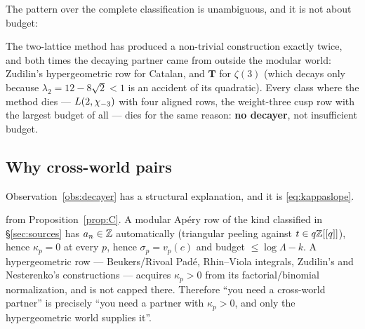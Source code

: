 \noindent
The pattern over the complete classification is unambiguous, and it is not
about budget:

\begin{observation}\label{obs:decayer}
The two-lattice method has produced a non-trivial construction exactly twice,
and both times the decaying partner came from outside the modular world:
Zudilin's hypergeometric row for Catalan, and $\mathbf T$ for $\zeta(3)$
(which decays only because $\lambda_2=12-8\sqrt2<1$ is an accident of its
quadratic).  Every class where the method dies --- $L(2,\chi_{-3})$ with four
aligned rows, the weight-three cusp row with the largest budget of all --- dies
for the same reason: \textbf{no decayer}, not insufficient budget.
\end{observation}

\subsection{Why cross-world pairs}\label{sec:5.5}

Observation~\ref{obs:decayer} has a structural explanation, and it is
\eqref{eq:kappaslope}.

\begin{proposition}\label{prop:crossworld}
\Proved{} from Proposition~\ref{prop:C}.  A modular Ap\'ery row of the kind
classified in \S\ref{sec:sources} has $a_n\in\mathbb{Z}$ automatically (triangular
peeling against $t\in q\mathbb{Z}[[q]]$), hence $\kappa_p=0$ at every $p$, hence
$\sigma_p=v_p(c)$ and budget $\le\log\Lambda-k$.  A hypergeometric row
--- Beukers/Rivoal Pad\'e, Rhin--Viola integrals, Zudilin's and Nesterenko's
constructions --- acquires $\kappa_p>0$ from its factorial/binomial
normalization, and is not capped there.  Therefore ``you need a cross-world
partner'' is precisely ``you need a partner with $\kappa_p>0$, and only the
hypergeometric world supplies it''.
\end{proposition}

